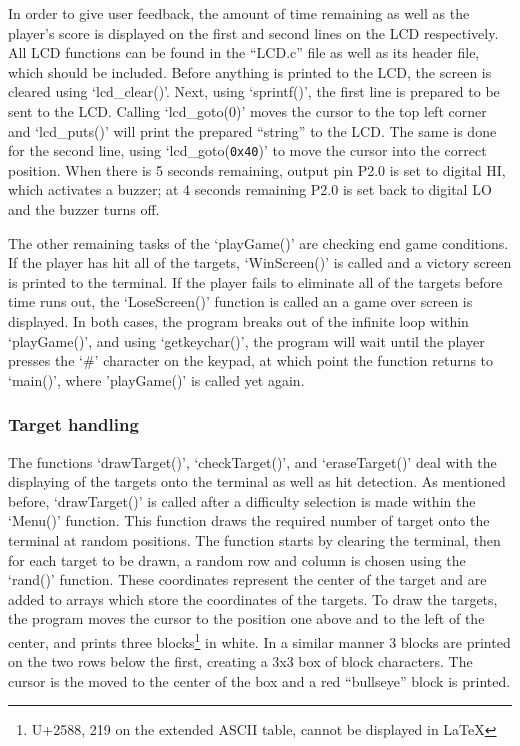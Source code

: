 \documentclass[12pt]{article}
\begin{document}
	In order to give user feedback, the amount of time remaining as well as the player's score is displayed on the first and second lines on the LCD respectively. All LCD functions can be found in the ``LCD.c'' file as well as its header file, which should be included. Before anything is printed to the LCD, the screen is cleared using `lcd\_clear()'. Next, using `sprintf()', the first line is prepared to be sent to the LCD. Calling `lcd\_goto(0)' moves the cursor to the top left corner and `lcd\_puts()' will print the prepared ``string'' to the LCD. The same is done for the second line, using `lcd\_goto(\texttt{0x40})' to move the cursor into the correct position. When there is 5 seconds remaining, output pin P2.0 is set to digital HI, which activates a buzzer; at 4 seconds remaining P2.0 is set back to digital LO and the buzzer turns off. 
	
	The other remaining tasks of the `playGame()' are checking end game conditions. If the player has hit all of the targets, `WinScreen()' is called and a victory screen is printed to the terminal. If the player fails to eliminate all of the targets before time runs out, the `LoseScreen()' function is called an a game over screen is displayed. In both cases, the program breaks out of the infinite loop within `playGame()', and using `getkeychar()', the program will wait until the player presses the `\#' character on the keypad, at which point the function returns to `main()', where 'playGame()' is called yet again. 
	
	\subsubsection{Target handling}
	The functions `drawTarget()', `checkTarget()', and `eraseTarget()' deal with the displaying of the targets onto the terminal as well as hit detection. As mentioned before, `drawTarget()' is called after a difficulty selection is made within the `Menu()' function. This function draws the required number of target onto the terminal at random positions. The function starts by clearing the terminal, then for each target to be drawn, a random row and column is chosen using the `rand()' function. These coordinates represent the center of the target and are added to arrays which store the coordinates of the targets. To draw the targets, the program moves the cursor to the position one above and to the left of the center, and prints three blocks\footnote{U+2588, 219 on the extended ASCII table, cannot be displayed in \LaTeX} in white. In a similar manner 3 blocks are printed on the two rows below the first, creating a 3x3 box of block characters. The cursor is the moved to the center of the box and a red ``bullseye'' block is printed. 
	
\end{document}
